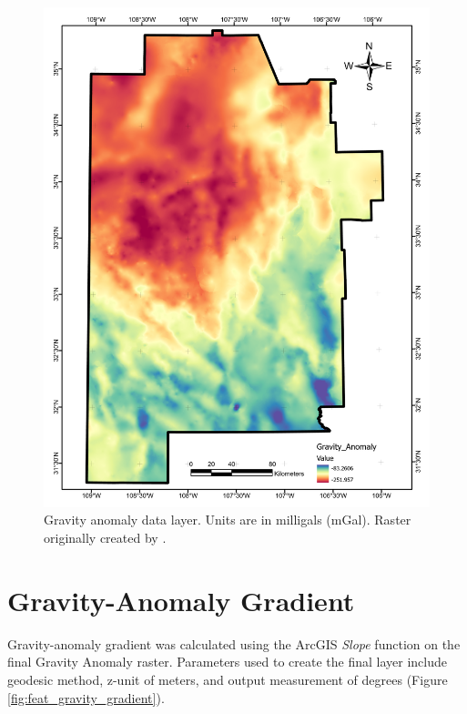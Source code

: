 \begin{figure}[H]
\centering
\includegraphics[width=0.75\linewidth]{templates/images/Figure-GravityAnomaly.pdf}
\caption[Gravity anomaly data layer]{Gravity anomaly data layer. Units are in milligals (mGal). Raster originally created by \protect\citet{bielicki_hydrogeolgic_2015}.}
\label{fig:feat_gravity}
\end{figure}
\pagebreak

\section{Gravity-Anomaly Gradient}\label{app:dl_grav_gradient}
Gravity-anomaly gradient was calculated using the ArcGIS \textit{Slope} function on the final Gravity Anomaly raster. Parameters used to create the final layer include geodesic method, z-unit of meters, and output measurement of degrees (Figure \ref{fig:feat_gravity_gradient}).

